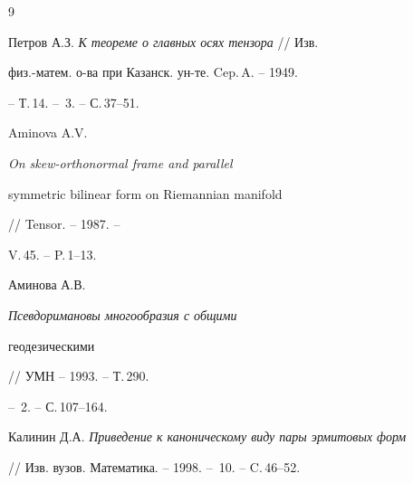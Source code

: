\begin{thebibliography}{9}







Петров А.З. {\em К теореме о главных осях тензора} // Изв.


физ.-матем. о-ва при Казанск. ун-те. Cep.\,A. -- 1949.


-- Т.\,14. -- \No\,3. -- С.\,37--51.




Aminova A.V. {\em On skew-orthonormal frame and parallel


symmetric bilinear form on Riemannian manifold} // Tensor. -- 1987. --


V.\,45. -- P.\,1--13.




Аминова А.В. {\em Псевдоримановы многообразия с общими


геодезическими} // УМН -- 1993. -- Т.\,290.


-- \No\,2. -- С.\,107--164.




Калинин Д.А. {\em Приведение к каноническому виду пары эрмитовых форм}


// Изв. вузов. Математика. -- 1998. -- \No\,10. -- C.\,46--52.





\end{thebibliography}





\vskip 2cm











\label{end}





